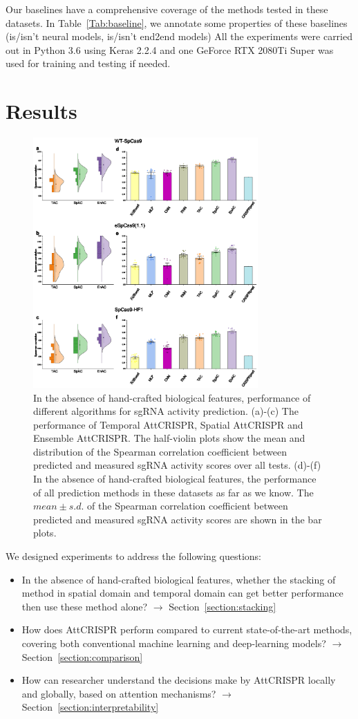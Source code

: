 \documentclass{bioinfo}
\begin{document}
Our baselines have a comprehensive coverage of the methods tested in these datasets. 
In Table~\ref{Tab:baseline}, we annotate some properties of these baselines (is/isn't neural models, is/isn't end2end models)
All the experiments were carried out in Python 3.6 using Keras 2.2.4 and one GeForce RTX 2080Ti Super was used for training and testing if needed. 

\section{Results}
\begin{figure}[!tpb]
    \centerline{\includegraphics[width=86mm]{baselinewithoutbiofeat.eps}}
    \caption{In the absence of hand-crafted biological features, performance of different algorithms for sgRNA activity prediction. 
    (a)-(c) The performance of Temporal AttCRISPR, Spatial AttCRISPR and Ensemble AttCRISPR. 
    The half-violin plots show the mean and distribution of the Spearman correlation coefficient between predicted and measured sgRNA activity scores over all tests. 
    (d)-(f) In the absence of hand-crafted biological features, the performance of all prediction methods in these datasets as far as we know. 
    The $mean \pm s.d.$ of the Spearman correlation coefficient between predicted and measured sgRNA activity scores are shown in the bar plots.}\label{fig:06}
\end{figure}
We designed experiments to address the following questions:
\begin{itemize}
    \item 
    In the absence of hand-crafted biological features, whether the stacking of method in spatial domain and temporal domain can get better performance then use these method alone? 
    $\rightarrow$ Section~\ref{section:stacking}
    \item 
    How does AttCRISPR perform compared to current state-of-the-art methods, covering both conventional machine learning and deep-learning models? 
    $\rightarrow$ Section~\ref{section:comparison}
    \item 
    How can researcher understand the decisions make by AttCRISPR locally and globally, based on attention mechanisms? 
    $\rightarrow$ Section~\ref{section:interpretability}
    \vspace*{1pt}
\end{itemize}
\end{document}
